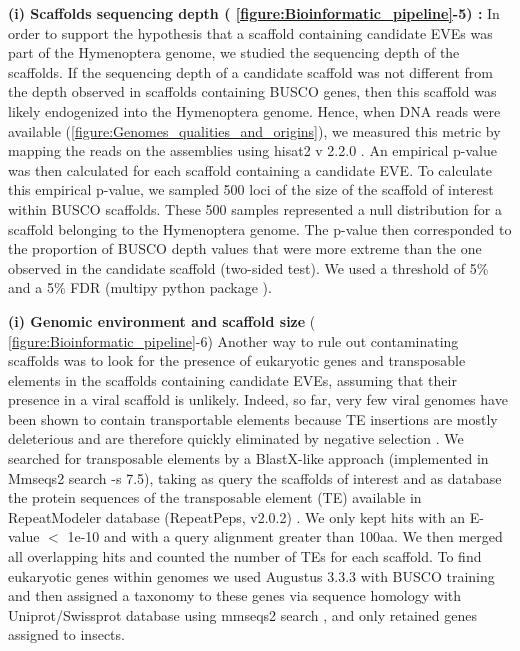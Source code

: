 \textbf{(i) Scaffolds sequencing depth (\figurename{ \ref{figure:Bioinformatic_pipeline}}-5) :}
In order to support the hypothesis that a scaffold containing candidate EVEs was part of the Hymenoptera genome, we studied the sequencing depth of the scaffolds. If the sequencing depth of a candidate scaffold was not different from the depth observed in scaffolds containing BUSCO genes, then this scaffold was likely endogenized into the Hymenoptera genome. Hence, when DNA reads were available (\figurename{\ref{figure:Genomes_qualities_and_origins}}), we measured this metric by mapping the reads on the assemblies using hisat2 v 2.2.0 \citep{kim_graph-based_2019}. An empirical p-value was then calculated for each scaffold containing a candidate EVE. To calculate this empirical p-value, we sampled 500 loci of the size of the scaffold of interest within BUSCO scaffolds. These 500 samples represented a null distribution for a scaffold belonging to the Hymenoptera genome. The p-value then corresponded to the proportion of BUSCO depth values that were more extreme than the one observed in the candidate scaffold (two-sided test). We used a threshold of 5\% and a 5\% FDR (multipy python package \citep{puolivali_influence_2020}). 

\textbf{(i) Genomic environment and scaffold size} (\figurename{ \ref{figure:Bioinformatic_pipeline}}-6)
Another way to rule out contaminating scaffolds was to look for the presence of eukaryotic genes and transposable elements in the scaffolds containing candidate EVEs, assuming that their presence in a viral scaffold is unlikely. Indeed, so far, very few viral genomes have been shown to contain transportable elements \citep{miller_virus_1982,gilbert_population_2014,gilbert_continuous_2016,gilbert_viruses_2017,loiseau_wide_2020} because TE insertions are mostly deleterious and are therefore quickly  eliminated by negative selection \citep{gilbert_continuous_2016, gilbert_viruses_2017}. We searched for transposable elements by a BlastX-like approach (implemented in Mmseqs2 search -s 7.5), taking as query the scaffolds of interest and as database the protein sequences of the transposable element (TE) available in RepeatModeler database (RepeatPeps, v2.0.2) \citep{flynn_repeatmodeler2_2020}. We only kept hits with an E-value $<$ 1e-10 and with a query alignment greater than 100aa. We then merged all overlapping hits and 
counted the number of TEs for each scaffold. To find eukaryotic genes within genomes we used Augustus 3.3.3 \citep{stanke_augustus_2004} with BUSCO training and then assigned a taxonomy to these genes via sequence homology with Uniprot/Swissprot database using mmseqs2 search \citep{steinegger_mmseqs2_2017}, and only retained genes assigned to insects.

